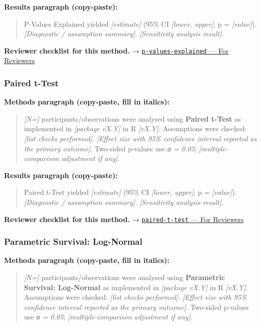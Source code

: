\documentclass[
]{article}
\begin{document}
\textbf{Results paragraph (copy-paste):}

\begin{quote}
P-Values Explained yielded \emph{{[}estimate{]}} (95\% CI
\emph{{[}lower, upper{]}}, p = \emph{{[}value{]}}). \emph{{[}Diagnostic
/ assumption summary{]}}. \emph{{[}Sensitivity analysis result{]}}.
\end{quote}

\textbf{Reviewer checklist for this method.} →
\href{../chapters/04-inferential/p-values-explained.Rmd\#for-reviewers}{\texttt{p-values-explained}
--- For Reviewers}

\subsubsection{Paired t-Test}\label{paired-t-test}

\textbf{Methods paragraph (copy-paste, fill in italics):}

\begin{quote}
\emph{{[}N={]}} participants/observations were analysed using
\textbf{Paired t-Test} as implemented in \emph{{[}package vX.Y{]}} in R
\emph{{[}vX.Y{]}}. Assumptions were checked: \emph{{[}list checks
performed{]}}. \emph{{[}Effect size with 95\% confidence interval
reported as the primary outcome{]}}. Two-sided p-values use \emph{α =
0.05}; \emph{{[}multiple-comparison adjustment if any{]}}.
\end{quote}

\textbf{Results paragraph (copy-paste):}

\begin{quote}
Paired t-Test yielded \emph{{[}estimate{]}} (95\% CI \emph{{[}lower,
upper{]}}, p = \emph{{[}value{]}}). \emph{{[}Diagnostic / assumption
summary{]}}. \emph{{[}Sensitivity analysis result{]}}.
\end{quote}

\textbf{Reviewer checklist for this method.} →
\href{../chapters/04-inferential/paired-t-test.Rmd\#for-reviewers}{\texttt{paired-t-test}
--- For Reviewers}

\subsubsection{Parametric Survival:
Log-Normal}\label{parametric-survival-log-normal}

\textbf{Methods paragraph (copy-paste, fill in italics):}

\begin{quote}
\emph{{[}N={]}} participants/observations were analysed using
\textbf{Parametric Survival: Log-Normal} as implemented in
\emph{{[}package vX.Y{]}} in R \emph{{[}vX.Y{]}}. Assumptions were
checked: \emph{{[}list checks performed{]}}. \emph{{[}Effect size with
95\% confidence interval reported as the primary outcome{]}}. Two-sided
p-values use \emph{α = 0.05}; \emph{{[}multiple-comparison adjustment if
any{]}}.
\end{quote}
\end{document}
